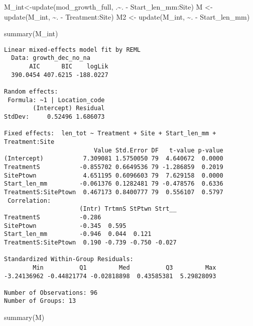 \documentclass[
  letterpaper,
  DIV=11,
  numbers=noendperiod]{scrartcl}
\newenvironment{Shaded}{\begin{snugshade}}{\end{snugshade}}
\newcommand{\FunctionTok}[1]{\textcolor[rgb]{0.28,0.35,0.67}{#1}}
\newcommand{\NormalTok}[1]{\textcolor[rgb]{0.00,0.23,0.31}{#1}}
\newcommand{\OtherTok}[1]{\textcolor[rgb]{0.00,0.23,0.31}{#1}}
\newcommand{\SpecialCharTok}[1]{\textcolor[rgb]{0.37,0.37,0.37}{#1}}
\begin{document}
\begin{Shaded}
\begin{Highlighting}[]
\NormalTok{  M\_int}\OtherTok{\textless{}{-}}\FunctionTok{update}\NormalTok{(mod\_growth\_full, .}\SpecialCharTok{\textasciitilde{}}\NormalTok{. }\SpecialCharTok{{-}}\NormalTok{ Start\_len\_mm}\SpecialCharTok{:}\NormalTok{Site)}
\NormalTok{  M }\OtherTok{\textless{}{-}} \FunctionTok{update}\NormalTok{(M\_int, }\SpecialCharTok{\textasciitilde{}}\NormalTok{. }\SpecialCharTok{{-}}\NormalTok{ Treatment}\SpecialCharTok{:}\NormalTok{Site)}
\NormalTok{  M2 }\OtherTok{\textless{}{-}} \FunctionTok{update}\NormalTok{(M\_int, }\SpecialCharTok{\textasciitilde{}}\NormalTok{. }\SpecialCharTok{{-}}\NormalTok{ Start\_len\_mm)}
  
  \FunctionTok{summary}\NormalTok{(M\_int)}
\end{Highlighting}
\end{Shaded}

\begin{verbatim}
Linear mixed-effects model fit by REML
  Data: growth_dec_no_na 
       AIC      BIC    logLik
  390.0454 407.6215 -188.0227

Random effects:
 Formula: ~1 | Location_code
        (Intercept) Residual
StdDev:     0.52496 1.686073

Fixed effects:  len_tot ~ Treatment + Site + Start_len_mm + Treatment:Site 
                         Value Std.Error DF   t-value p-value
(Intercept)           7.309081 1.5750050 79  4.640672  0.0000
TreatmentS           -0.855702 0.6649536 79 -1.286859  0.2019
SitePtown             4.651195 0.6096603 79  7.629158  0.0000
Start_len_mm         -0.061376 0.1282481 79 -0.478576  0.6336
TreatmentS:SitePtown  0.467173 0.8400777 79  0.556107  0.5797
 Correlation: 
                     (Intr) TrtmnS StPtwn Strt__
TreatmentS           -0.286                     
SitePtown            -0.345  0.595              
Start_len_mm         -0.946  0.044  0.121       
TreatmentS:SitePtown  0.190 -0.739 -0.750 -0.027

Standardized Within-Group Residuals:
        Min          Q1         Med          Q3         Max 
-3.24136962 -0.44821774 -0.02818898  0.43585381  5.29828093 

Number of Observations: 96
Number of Groups: 13 
\end{verbatim}

\begin{Shaded}
\begin{Highlighting}[]
  \FunctionTok{summary}\NormalTok{(M)}
\end{Highlighting}
\end{Shaded}
\end{document}
